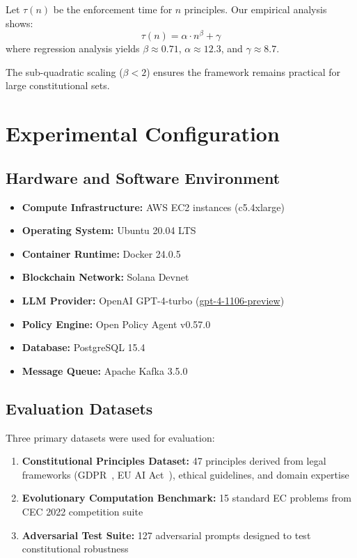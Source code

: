 Let $\tau(n)$ be the enforcement time for $n$ principles. Our empirical analysis shows:
\[\tau(n) = \alpha \cdot n^{\beta} + \gamma\]
where regression analysis yields $\beta \approx 0.71$, $\alpha \approx 12.3$\ms{}, and $\gamma \approx 8.7$\ms{}.

The sub-quadratic scaling ($\beta < 2$) ensures the framework remains practical for large constitutional sets.

\section{Experimental Configuration}\label{sec:appendix_experimental}

\subsection{Hardware and Software Environment}
\begin{itemize}[leftmargin=*,topsep=2pt,itemsep=2pt,parsep=0pt]
    \item \textbf{Compute Infrastructure:} AWS EC2 instances (c5.4xlarge)
    \item \textbf{Operating System:} Ubuntu 20.04 LTS
    \item \textbf{Container Runtime:} Docker 24.0.5
    \item \textbf{Blockchain Network:} Solana Devnet
    \item \textbf{LLM Provider:} OpenAI GPT-4-turbo (\url{gpt-4-1106-preview})
    \item \textbf{Policy Engine:} Open Policy Agent v0.57.0
    \item \textbf{Database:} PostgreSQL 15.4
    \item \textbf{Message Queue:} Apache Kafka 3.5.0
\end{itemize}

\subsection{Evaluation Datasets}
Three primary datasets were used for evaluation:

\begin{enumerate}
    \item \textbf{Constitutional Principles Dataset:} 47 principles derived from legal frameworks (GDPR~\cite{gdpr2016}, EU AI Act~\cite{eu2024ai}), ethical guidelines, and domain expertise
    \item \textbf{Evolutionary Computation Benchmark:} 15 standard EC problems from CEC 2022 competition suite
    \item \textbf{Adversarial Test Suite:} 127 adversarial prompts designed to test constitutional robustness
\end{enumerate}

